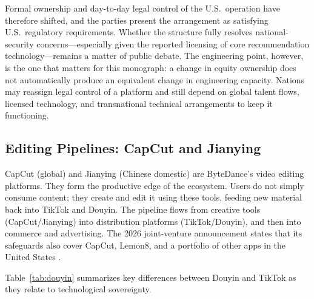 \documentclass[12pt,letterpaper]{article}
\begin{document}
Formal ownership and day-to-day legal control of the U.S.\ operation have therefore shifted, and the parties present the arrangement as satisfying U.S.\ regulatory requirements. Whether the structure fully resolves national-security concerns---especially given the reported licensing of core recommendation technology---remains a matter of public debate. The engineering point, however, is the one that matters for this monograph: a change in equity ownership does not automatically produce an equivalent change in engineering capacity. Nations may reassign legal control of a platform and still depend on global talent flows, licensed technology, and transnational technical arrangements to keep it functioning.

\subsection{Editing Pipelines: CapCut and Jianying}

CapCut (global) and Jianying (Chinese domestic) are ByteDance's video editing platforms. They form the productive edge of the ecosystem. Users do not simply consume content; they create and edit it using these tools, feeding new material back into TikTok and Douyin. The pipeline flows from creative tools (CapCut/Jianying) into distribution platforms (TikTok/Douyin), and then into commerce and advertising. The 2026 joint-venture announcement states that its safeguards also cover CapCut, Lemon8, and a portfolio of other apps in the United States \cite{tiktokusds2026}.

Table~\ref{tab:douyin} summarizes key differences between Douyin and TikTok as they relate to technological sovereignty.
\end{document}
